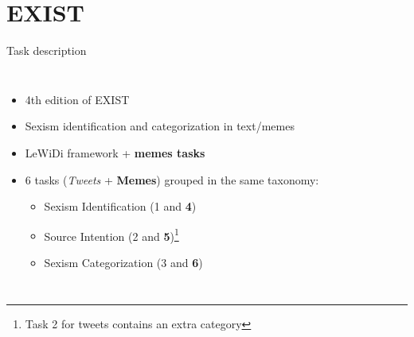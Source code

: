 \section{EXIST}
\begin{frame}{Task description}
  
\begin{columns}
\begin{itemize}
    \item 4th edition of EXIST
    \item Sexism identification and categorization in text/memes
    \item LeWiDi framework + \textbf{memes tasks}
    \item 6 tasks (\textit{Tweets} + \textbf{Memes}) grouped in the same taxonomy:
    \begin{itemize}
        \item Sexism Identification (1 and \textbf{4})
        \item Source Intention (2 and \textbf{5})\footnote{Task 2 for tweets contains an extra category}
        \item Sexism Categorization (3 and \textbf{6})
    \end{itemize}
\end{itemize}
\centering

\begin{table}[]
    \huge
\end{table}
\end{columns}
\end{frame}

